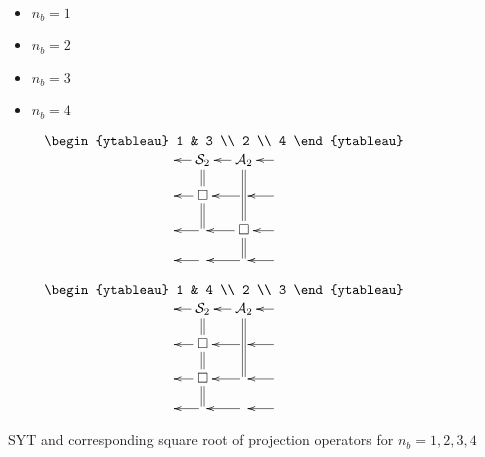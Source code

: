 \newcommand{\YTtthree}[0]{
$
\bcen
\text{
\begin{ytableau}
1 & 3
\\
2
\\
4
\end{ytableau}
}
\\
\xymatrix@R=1pc@C=1pc{
&\ar[l]\ar@2{-}[d]\cals_2
&\ar[l]\ar@2{-}[dd]\cala_2
&\ar[l]
\\
&\ar[l]\square \ar@2{-}[d]
&\ar[l]
&\ar[l]
\\
&\ar[l]
&\ar[l]\square \ar@2{-}[d]
&\ar[l]
\\
&\ar[l]&\ar[l]&\ar[l]
}\ecen
$
}

\newcommand{\YTtfour}[0]{
$
\bcen
\text{
\begin{ytableau}
1 & 4
\\
2
\\
3
\end{ytableau}
}
\\
\xymatrix@R=1pc@C=1pc{
&\ar[l]\ar@2{-}[d]\cals_2
&\ar[l]\ar@2{-}[dd]\cala_2
&\ar[l]
\\
&\ar[l]\square \ar@2{-}[d]
&\ar[l]
&\ar[l]
\\
&\ar[l]\square \ar@2{-}[d]
&\ar[l]
&\ar[l]
\\
&\ar[l]&\ar[l]&\ar[l]
}\ecen
$
}



\begin{itemize}

\item $n_b=1$

\YTone

\item $n_b=2$

\YTs
\YTa

\item  $n_b=3$

\YTss

\YTsa
\quad\YTas

\YTaa

\item $n_b=4$

\YTsss

\YTsFour
\quad\YTsaFour
\quad\YTasFour

\YTsquare
\quad\YTsquareP

\YTttwo
\quad\YTtthree
\quad\YTtfour

\YTaaa
\end{itemize}
SYT
and corresponding square root of projection operators for $n_b=1, 2,3,4$

